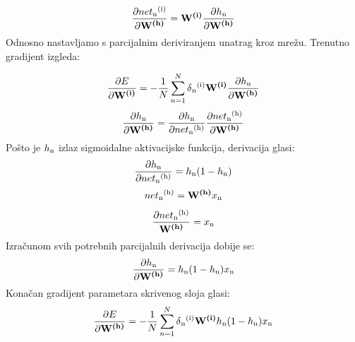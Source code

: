 \documentclass[times, utf8, diplomski]{fer}
\begin{document}
\begin{equation}
	\frac{\partial net\textsubscript{n}\textsuperscript{(i)}}{\partial \textbf{W\textsuperscript{(h)}}} = \textbf{W\textsuperscript{(i)}} \frac{\partial h\textsubscript{n}}{\partial \textbf{W\textsuperscript{(h)}}} 
\end{equation}
Odnosno nastavljamo s parcijalnim deriviranjem unatrag kroz mrežu. Trenutno gradijent izgleda:

\begin{equation}
	\frac{\partial E}{\partial \textbf{W\textsuperscript{(i)}}} = -\frac{1}{N}\sum_{n=1}^{N} \delta\textsubscript{n}\textsuperscript{(i)}\textbf{W\textsuperscript{(i)}}\frac{\partial h\textsubscript{n}}{\partial \textbf{W\textsuperscript{(h)}}}
\end{equation}
\begin{equation}
\frac{\partial h\textsubscript{n}}{\partial \textbf{W\textsuperscript{(h)}}} = \frac{\partial h\textsubscript{n}}{\partial net\textsubscript{n}\textsuperscript{(h)}}\frac{\partial net\textsubscript{n}\textsuperscript{(h)}}{\partial \textbf{W\textsuperscript{(h)}}}
\end{equation}
Pošto je $h\textsubscript{n}$ izlaz sigmoidalne aktivacijske funkcija, derivacija glasi:
\begin{equation}
\frac{\partial h\textsubscript{n}}{\partial net\textsubscript{n}\textsuperscript{(h)}} = h\textsubscript{n}(1 - h\textsubscript{n})
\end{equation}
\begin{equation}
net\textsubscript{n}\textsuperscript{(h)} = \textbf{W\textsuperscript{(h)}}x\textsubscript{n}
\end{equation}
\begin{equation}
\frac{\partial net\textsubscript{n}\textsuperscript{(h)}}{\textbf{W\textsuperscript{(h)}}} = x\textsubscript{n}
\end{equation}
Izračunom svih potrebnih parcijalnih derivacija dobije se:
\begin{equation}
\frac{\partial h\textsubscript{n}}{\partial \textbf{W\textsuperscript{(h)}}} = h\textsubscript{n}(1 - h\textsubscript{n})x\textsubscript{n}
\end{equation}
Konačan gradijent parametara skrivenog sloja glasi:
\begin{equation}
	\frac{\partial E}{\partial \textbf{W\textsuperscript{(h)}}} = -\frac{1}{N}\sum_{n=1}^{N} \delta\textsubscript{n}\textsuperscript{(i)}\textbf{W\textsuperscript{(i)}}h\textsubscript{n}(1 - h\textsubscript{n})x\textsubscript{n}
\end{equation}
\end{document}

